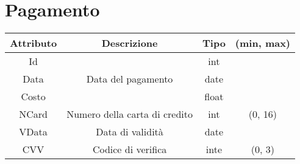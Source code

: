 \section{Pagamento}
\begin{center}
    \begin{tabular}{||c c c c||}
        \hline
        Attributo & Descrizione & Tipo & (min, max) \\ [0.5ex]
        \hline \hline
        Id &  & int &  \\
        Data & Data del pagamento & date &  \\
        Costo &  & float &  \\
        NCard & Numero della carta di credito & int & (0, 16) \\
        VData & Data di validità & date &  \\
        CVV & Codice di verifica & inte & (0, 3) \\
        \hline
    \end{tabular}
\end{center}